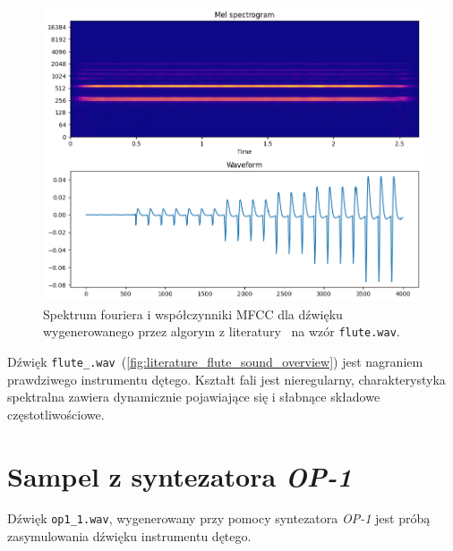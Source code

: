 \begin{multicols}{3}
\begin{figure}[H]
    \centering
    \includegraphics[width=0.9\linewidth]{rys06/macret_evolved_flute.png}
    \caption{
      Spektrum fouriera i współczynniki MFCC dla dźwięku
      wygenerowanego przez algorym z literatury~\cite{evolutionary_puredata}
      na wzór \texttt{flute.wav}.
    }\label{fig:evolved_literature_flute}
\end{figure}
\end{multicols}

Dźwięk \texttt{flute\_.wav}~(\ref{fig:literature_flute_sound_overview})
jest nagraniem prawdziwego instrumentu dętego. Kształt fali jest nieregularny,
charakterystyka spektralna zawiera dynamicznie pojawiające się i słabnące 
składowe częstotliwościowe.

\section{Sampel z syntezatora \textit{OP-1}}

Dźwięk \texttt{op1\_1.wav}, wygenerowany przy pomocy syntezatora \textit{OP-1} jest próbą
zasymulowania dźwięku instrumentu dętego.

